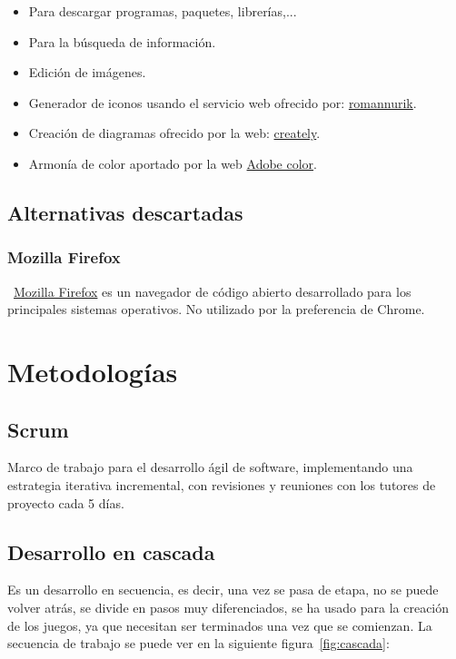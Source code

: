 \begin{itemize}
	\item Para descargar programas, paquetes, librerías,...
	\item Para la búsqueda de información.
	\item Edición de imágenes.
	\item Generador de iconos usando el servicio web ofrecido por: \href{https://romannurik.github.io/AndroidAssetStudio}{romannurik}.
	\item Creación de diagramas ofrecido por la web: \href{https://app.creately.com}{creately}.
	\item Armonía de color aportado por la web \href{https://color.adobe.com/es/create/color-wheel}{Adobe color}.
\end{itemize}

\subsection{Alternativas descartadas}

\subsubsection{Mozilla Firefox}\label{mozilla}
~\href{https://www.mozilla.org/es-ES/firefox/new/}{Mozilla Firefox} es un navegador de código abierto desarrollado para los principales sistemas operativos. No utilizado por la preferencia de Chrome.

\section{Metodologías}

\subsection{Scrum}
Marco de trabajo para el desarrollo ágil de software, implementando una estrategia iterativa incremental, con revisiones y reuniones con los tutores de proyecto cada 5 días.

\subsection{Desarrollo en cascada}
Es un desarrollo en secuencia, es decir, una vez se pasa de etapa, no se puede volver atrás, se divide en pasos muy diferenciados, se ha usado para la creación de los juegos, ya que necesitan ser terminados una vez que se comienzan. La secuencia de trabajo se puede ver en la siguiente figura~\ref{fig:cascada}:

